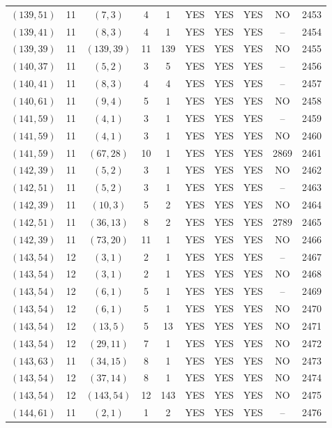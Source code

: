 \begin{longtable}{|c|c|c|c|c|c|c|c|c|c|}
$(139, 51)$ & 11 & $(7, 3)$ & 4 & 1 & YES & YES & YES & NO & 2453\\
$(139, 41)$ & 11 & $(8, 3)$ & 4 & 1 & YES & YES & YES & -- & 2454\\
$(139, 39)$ & 11 & $(139, 39)$ & 11 & 139 & YES & YES & YES & NO & 2455\\
$(140, 37)$ & 11 & $(5, 2)$ & 3 & 5 & YES & YES & YES & -- & 2456\\
$(140, 41)$ & 11 & $(8, 3)$ & 4 & 4 & YES & YES & YES & -- & 2457\\
$(140, 61)$ & 11 & $(9, 4)$ & 5 & 1 & YES & YES & YES & NO & 2458\\
$(141, 59)$ & 11 & $(4, 1)$ & 3 & 1 & YES & YES & YES & -- & 2459\\
$(141, 59)$ & 11 & $(4, 1)$ & 3 & 1 & YES & YES & YES & NO & 2460\\
$(141, 59)$ & 11 & $(67, 28)$ & 10 & 1 & YES & YES & YES & 2869 & 2461\\
$(142, 39)$ & 11 & $(5, 2)$ & 3 & 1 & YES & YES & YES & NO & 2462\\
$(142, 51)$ & 11 & $(5, 2)$ & 3 & 1 & YES & YES & YES & -- & 2463\\
$(142, 39)$ & 11 & $(10, 3)$ & 5 & 2 & YES & YES & YES & NO & 2464\\
$(142, 51)$ & 11 & $(36, 13)$ & 8 & 2 & YES & YES & YES & 2789 & 2465\\
$(142, 39)$ & 11 & $(73, 20)$ & 11 & 1 & YES & YES & YES & NO & 2466\\
$(143, 54)$ & 12 & $(3, 1)$ & 2 & 1 & YES & YES & YES & -- & 2467\\
$(143, 54)$ & 12 & $(3, 1)$ & 2 & 1 & YES & YES & YES & NO & 2468\\
$(143, 54)$ & 12 & $(6, 1)$ & 5 & 1 & YES & YES & YES & -- & 2469\\
$(143, 54)$ & 12 & $(6, 1)$ & 5 & 1 & YES & YES & YES & NO & 2470\\
$(143, 54)$ & 12 & $(13, 5)$ & 5 & 13 & YES & YES & YES & NO & 2471\\
$(143, 54)$ & 12 & $(29, 11)$ & 7 & 1 & YES & YES & YES & NO & 2472\\
$(143, 63)$ & 11 & $(34, 15)$ & 8 & 1 & YES & YES & YES & NO & 2473\\
$(143, 54)$ & 12 & $(37, 14)$ & 8 & 1 & YES & YES & YES & NO & 2474\\
$(143, 54)$ & 12 & $(143, 54)$ & 12 & 143 & YES & YES & YES & NO & 2475\\
$(144, 61)$ & 11 & $(2, 1)$ & 1 & 2 & YES & YES & YES & -- & 2476\\

\end{longtable}
